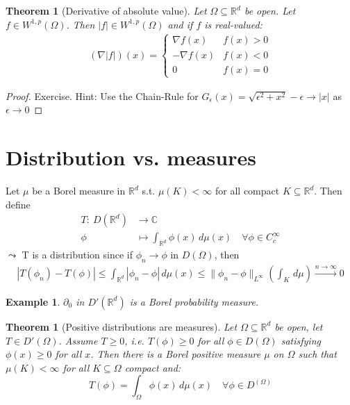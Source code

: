 \documentclass{report}
\theoremstyle{tommy}
\newtheorem{thm}[defn]{Theorem}
\newtheorem{eg}[defn]{Example}
\begin{document}
  
  \begin{thm}[Derivative of absolute value] Let \(\Omega \subseteq \mathbb{R}^d\) be open. Let \(f \in W^{1,p}(\Omega)\). 
    Then \(|f| \in W^{1,p}(\Omega)\)
    and  if \(f\) is real-valued:
    \begin{align*}
      (\nabla |f|) (x) =
      \begin{cases}
        \nabla f(x) & f(x) > 0 \\
        -\nabla f(x) & f(x) < 0 \\
        0 & f(x) = 0
      \end{cases}
    \end{align*}
  \end{thm}

  \begin{proof}
    Exercise. Hint: Use the Chain-Rule for \(G_\epsilon(x) = \sqrt{\epsilon^2 + x^2} - \epsilon \to |x|\) as  \(\epsilon \to 0\)
  \end{proof}

  \section{Distribution vs. measures}
  Let \(\mu\) be a Borel measure in \(\mathbb{R}^d\) s.t. \(\mu(K) < \infty\) for all compact \(K \subseteq \mathbb{R}^d\). Then define 
  \begin{align*}
    T: \ D(\mathbb{R}^d) &\longrightarrow \mathbb{C} \\
    \phi &\longmapsto \int_{\mathbb{R}^d} \phi(x) \, d\mu(x) \quad \forall \phi \in C_c^\infty
  \end{align*}
  \(\leadsto\) T is a distribution since if \(\phi_n \to \phi\) in \(D(\Omega)\), then
  \begin{align*}
    |T(\phi_n) - T(\phi)| 
    \le \int_{\mathbb{R}^d} |\phi_n - \phi| \, d\mu(x) \le \|\phi_n - \phi\|_{L^\infty} \left(\int_{K} \, d \mu \right) \xrightarrow{n \to \infty} 0
  \end{align*}
  
  
  \begin{eg}
    \(\partial_0\) in \(D'(\mathbb{R}^d)\) is a Borel probability measure.
  \end{eg}  

  
  \begin{thm}[Positive distributions are measures] 
    Let \(\Omega \subseteq \mathbb{R}^d\) be open, let \(T \in D'(\Omega)\). Assume \(T \ge 0\), i.e. \(T(\phi) \ge 0\) for all \(\phi \in D(\Omega)\) satisfying \(\phi(x) \ge 0\) for all \(x\). Then there is a Borel positive measure \(\mu\) on \(\Omega\) such that \(\mu(K) < \infty\) for all \(K \subseteq \Omega\) compact and:
    \[T(\phi) = \int_\Omega \phi(x) \, d\mu (x) \quad \forall \phi \in D^(\Omega)\]
  \end{thm}
\end{document}
